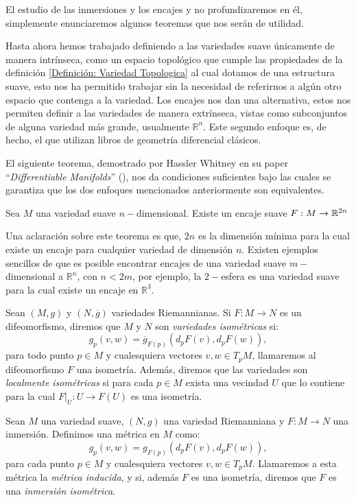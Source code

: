 El estudio de las inmersiones y los encajes y no profundizaremos en él, simplemente enunciaremos algunos teoremas que nos serán de utilidad.

Hasta ahora hemos trabajado definiendo a las variedades suave únicamente de manera intrínseca, como un espacio topológico que cumple las propiedades de la definición \ref{Definición: Variedad Topologica} al cual dotamos de una estructura suave, esto nos ha permitido trabajar sin la necesidad de referirnos a algún otro espacio que contenga a la variedad. Los encajes nos dan una alternativa, estos nos permiten definir a las variedades de manera extrínseca, vistas como subconjuntos de alguna variedad más grande, usualmente $\mathbb{R}^{n}$. Este segundo enfoque es, de hecho, el que utilizan libros de geometría diferencial clásicos.

El siguiente teorema, demostrado por Hassler Whitney en su paper \enquote{\textit{Differentiable Manifolds}} (\textcite{whitney1936differentiable}), nos da condiciones suficientes bajo las cuales se garantiza que los dos enfoques mencionados anteriormente son equivalentes.

\begin{theorem}
	Sea $M$ una variedad suave $n-$dimensional. Existe un encaje suave $F: M \to \mathbb{R}^{2n}$
\end{theorem}

Una aclaración sobre este teorema es que, $2n$ es la dimensión mínima para la cual existe un encaje para cualquier variedad de dimensión $n$. Existen ejemplos sencillos de que es posible encontrar encajes de una variedad suave $m-$dimensional a $\mathbb{R}^{n}$, con $n < 2m$, por ejemplo, la $2-$esfera es una variedad suave para la cual existe un encaje en $\mathbb{R}^{3}$.

\begin{definition}[Isometría]
	Sean $(M,g)$ y $(N,\overline{g})$ variedades Riemannianas. Si $F: M \to N$ es un difeomorfismo, diremos que $M$ y $N$ son \textit{variedades isométricas} si:
	\[
		g_{p}(v,w) = \overline{g}_{F(p)}(d_{p}F(v), d_{p}F(w)),
	\]
	para todo punto $p \in M$ y cualesquiera vectores $v,w \in T_{p}M$, llamaremos al difeomorfismo $F$ una isometría.
	Además, diremos que las variedades son \textit{localmente isométricas} si para cada $p \in M$ exista una vecindad $U$ que lo contiene para la cual $F|_{U} : U \to F(U)$ es una isometría.
\end{definition}

\begin{definition}
	Sean $M$ una variedad suave, $(N,g)$ una variedad Riemanniana y $F: M \to N$ una inmersión. Definimos una métrica en $M$ como:
	\[
		g_{p}(v,w) = g_{F(p)}(d_{p}F(v), d_{p}F(w)),
	\]
	para cada punto $p \in M$ y cualesquiera vectores $v, w \in T_{p}M$. Llamaremos a esta métrica la \textit{métrica inducida}, y si, además $F$ es una isometría, diremos que $F$ es una \textit{inmersión isométrica}.
\end{definition}

